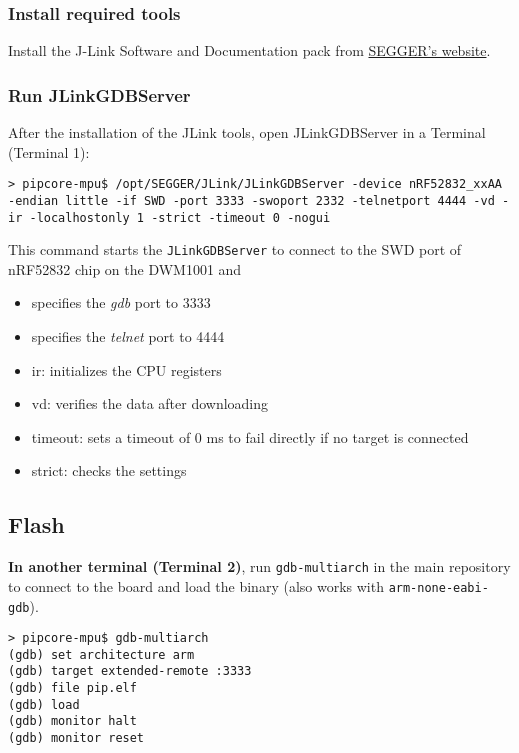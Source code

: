 \documentclass[10pt,a4paper,titlepage]{refart}
\begin{document}
\subsubsection{Install required tools}
Install the J-Link Software and Documentation pack from \href{https://www.segger.com/downloads/jlink/#J-LinkSoftwareAndDocumentationPack}{SEGGER's website}.


\subsubsection{Run JLinkGDBServer}
After the installation of the JLink tools, open JLinkGDBServer in a Terminal (Terminal 1):

\begin{lstlisting}[style=BashStyle]
> pipcore-mpu$ /opt/SEGGER/JLink/JLinkGDBServer -device nRF52832_xxAA -endian little -if SWD -port 3333 -swoport 2332 -telnetport 4444 -vd -ir -localhostonly 1 -strict -timeout 0 -nogui
\end{lstlisting}
This command starts the \texttt{JLinkGDBServer} to connect to the SWD port of nRF52832 chip on the DWM1001 and
\begin{itemize}
	\item specifies the \textit{gdb} port to 3333
	\item specifies the \textit{telnet} port to 4444
	\item ir: initializes the CPU registers
	\item vd: verifies the data after downloading
	\item timeout: sets a timeout of 0 ms to fail directly if no target is connected
	\item strict: checks the settings
\end{itemize}

\subsection{Flash}
\textbf{In another terminal (Terminal 2)}, run \texttt{gdb-multiarch} in the main repository to connect to the board and load the binary (also works with \texttt{arm-none-eabi-gdb}).

\begin{lstlisting}[style=BashStyle]
> pipcore-mpu$ gdb-multiarch
(gdb) set architecture arm
(gdb) target extended-remote :3333
(gdb) file pip.elf
(gdb) load
(gdb) monitor halt
(gdb) monitor reset
\end{lstlisting}
\end{document}
